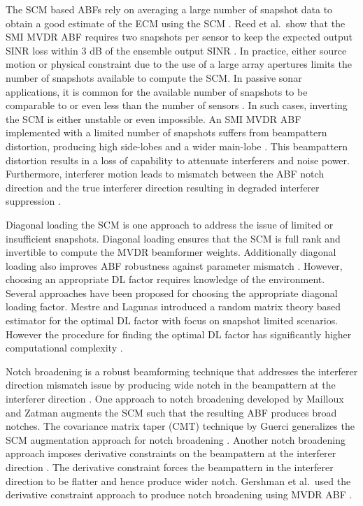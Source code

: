 The SCM based ABFs rely on averaging a large number of snapshot data
to obtain a good estimate of the ECM using the SCM \cite{vtree2002oap,
  reed1974rapid}. Reed et al.\ show that the SMI MVDR ABF requires two
snapshots per sensor to keep the expected output SINR loss within $3$
dB of the ensemble output SINR \cite{reed1974rapid}. In practice,
either source motion or physical constraint due to the use of a large
array apertures limits the number of snapshots available to compute
the SCM. In passive sonar applications, it is common for the available
number of snapshots to be comparable to or even less than the number
of sensors \cite{baggeroer1999passive}. In such cases, inverting the
SCM is either unstable or even impossible. An SMI MVDR ABF implemented
with a limited number of snapshots suffers from beampattern
distortion, producing high side-lobes and a wider main-lobe
\cite{richmond96pdfarray,Carlson1988scm}. This beampattern distortion
results in a loss of capability to attenuate interferers and noise
power. Furthermore, interferer motion leads to mismatch between the
ABF notch direction and the true interferer direction resulting in
degraded interferer suppression \cite{baggeroer1999passive,
  cox2002adaptive, riba1997comm}.

Diagonal loading the SCM is one approach to address the issue of
limited or insufficient snapshots. Diagonal loading ensures that the
SCM is full rank and invertible to compute the MVDR beamformer
weights. Additionally diagonal loading also improves ABF robustness
against parameter mismatch \cite{vtree2002oap,
  mestre2005diagonal}. However, choosing an appropriate DL factor
requires knowledge of the environment. Several approaches have been
proposed for choosing the appropriate diagonal loading factor. Mestre
and Lagunas introduced a random matrix theory based estimator for the
optimal DL factor with focus on snapshot limited scenarios. However
the procedure for finding the optimal DL factor has significantly
higher computational complexity \cite{mestre2006finite}.

Notch broadening is a robust beamforming technique that addresses the
interferer direction mismatch issue by producing wide notch in the
beampattern at the interferer direction
\cite[Sec.~6.7.6]{vtree2002oap}. One approach to notch broadening
developed by Mailloux \cite{mailloux1995null} and Zatman
\cite{zatman1995null} augments the SCM such that the resulting ABF
produces broad notches. The covariance matrix taper (CMT) technique by
Guerci generalizes the SCM augmentation approach for notch broadening
\cite{guerci1999cmt}. Another notch broadening approach imposes
derivative constraints on the beampattern at the interferer direction
\cite[Sec.~6.7.1.4]{vtree2002oap}. The derivative constraint forces
the beampattern in the interferer direction to be flatter and hence
produce wider notch. Gershman et al.\ used the derivative constraint
approach to produce notch broadening using MVDR ABF
\cite{gershman1991synthesis}.

